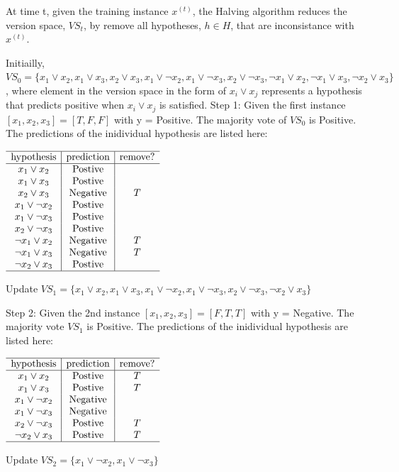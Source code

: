\documentclass[paper=a4, fontsize=11pt]{scrartcl} %
\numberwithin{equation}{section} %
\numberwithin{figure}{section} %
\numberwithin{table}{section} %
\begin{document}
At time t, given the training instance $x^{(t)}$, the Halving algorithm reduces the version space, $VS_t$, by remove all hypotheses, $h \in H$, that are inconsistance with $x^{(t)}$. 
\bigbreak

Initiailly, $VS_0 = 
\{
x_1 \lor x_2, x_1 \lor x_3, x_2 \lor x_3,
x_1 \lor \neg x_2, x_1 \lor \neg x_3, x_2 \lor \neg x_3,
\neg x_1 \lor x_2, \neg x_1 \lor x_3, \neg x_2 \lor x_3
\}$
, where element in the version space in the form of $x_i \lor x_j$ represents a hypothesis that predicts positive when $x_i \lor x_j$ is satisfied. 
\bigbreak
Step 1: Given the first instance $[x_1,x_2,x_3] = [T,F,F]$ with y = Positive. The majority vote of $VS_0$ is Positive. The predictions of the inidividual hypothesis are listed here: 

\begin{center}
$
\begin{array}{c|c|c}
\hline
\text{hypothesis} & \text{prediction} & \text{remove?} \\
\hline
x_1 \lor x_2 & \text{Postive} &  \\ 
x_1 \lor x_3 & \text{Postive} & \\ 
x_2 \lor x_3 & \text{Negative} & T \\ 
x_1 \lor \neg x_2 & \text{Postive} &  \\ 
x_1 \lor \neg x_3 & \text{Postive} &  \\ 
x_2 \lor \neg x_3 & \text{Postive} &  \\ 
\neg x_1 \lor x_2 & \text{Negative} & T \\ 
\neg x_1 \lor x_3 & \text{Negative} & T \\ 
\neg x_2 \lor x_3 & \text{Postive} &  \\ 
\hline
\end{array}
$
\end{center}

Update $VS_1 = 
\{
x_1 \lor x_2, x_1 \lor x_3, 
x_1 \lor \neg x_2, x_1 \lor \neg x_3, x_2 \lor \neg x_3,
\neg x_2 \lor x_3
\}$

\smallbreak
Step 2: Given the 2nd instance $[x_1,x_2,x_3] = [F,T,T]$ with y = Negative. The majority vote $VS_1$ is Positive. The predictions of the inidividual hypothesis are listed here: 
\begin{center}
$
\begin{array}{c|c|c}
\hline
\text{hypothesis} & \text{prediction} & \text{remove?} \\
\hline
x_1 \lor x_2 & \text{Postive} & T \\ 
x_1 \lor x_3 & \text{Postive} & T \\ 
x_1 \lor \neg x_2 & \text{Negative} &  \\ 
x_1 \lor \neg x_3 & \text{Negative} &  \\ 
x_2 \lor \neg x_3 & \text{Postive} & T \\ 
\neg x_2 \lor x_3 & \text{Postive} & T \\ 
\hline
\end{array}
$
\end{center}
Update $VS_2 = 
\{
x_1 \lor \neg x_2, x_1 \lor \neg x_3
\}$
\end{document}
